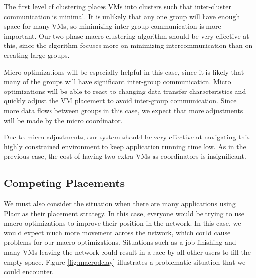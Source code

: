 \documentclass[11pt]{article}
\begin{document}
The first level of clustering places VMs into clusters such that inter-cluster communication is minimal.  It is unlikely that any one group will have enough space for many VMs, so minimizing inter-group communication is more important.  Our two-phase macro clustering algorithm should be very effective at this, since the algorithm focuses more on minimizing intercommunication than on creating large groups.

Micro optimizations will be especially helpful in this case, since it is likely that many of the groups will have significant inter-group communication.  Micro optimizations will be able to react to changing data transfer characteristics and quickly adjust the VM placement to avoid inter-group communication.  Since more data flows between groups in this case, we expect that more adjustments will be made by the micro coordinator.

Due to micro-adjustments, our system should be very effective at navigating this highly constrained environment to keep application running time low.  As in the previous case, the cost of having two extra VMs as coordinators is insignificant.


\subsection{Competing Placements}

We must also consider the situation when there are many applications using Placr as their placement strategy.  In this case, everyone would be trying to use macro optimizations to improve their position in the network.  In this case, we would expect much more movement across the network, which could cause problems for our macro optimizations.  Situations such as a job finishing and many VMs leaving the network could result in a race by all other users to fill the empty space.  Figure \ref{fig:macrodelay} illustrates a problematic situation that we could encounter.
\end{document}
